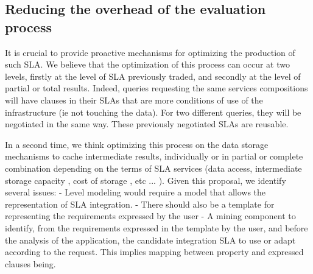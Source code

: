 \subsection{Reducing the overhead of the evaluation process}
\label{sec:queryProcessOpt}
  
 It is  crucial to provide proactive mechanisms for optimizing the production of such SLA. We believe that the optimization of this process can occur at two levels, firstly at the level of SLA previously traded, and secondly at the level of partial or total results. Indeed, queries requesting the same services compositions will have clauses in their SLAs that are more conditions of use of the infrastructure (ie not touching the data). For two different queries, they will be negotiated in the same way. These previously negotiated SLAs are reusable.

In a second time, we think optimizing this process on the data storage mechanisms to cache intermediate results, individually or in partial or complete combination depending on the terms of SLA services (data access, intermediate storage capacity , cost of storage , etc ... ).
Given this proposal, we identify several issues:
- Level modeling would require a model that allows the representation of SLA integration.
- There should also be a template for representing the requirements expressed by the user
- A mining component to identify, from the requirements expressed in the template by the user, and before the analysis of the application, the candidate integration SLA to use or adapt according to the request. This implies mapping between property and expressed clauses being.

